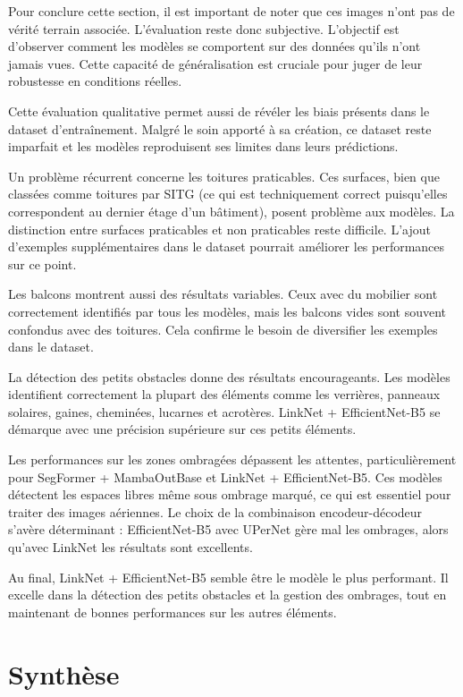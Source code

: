 Pour conclure cette section, il est important de noter que ces images n'ont pas de vérité terrain associée. L'évaluation reste donc subjective. L'objectif est d'observer comment les modèles se comportent sur des données qu'ils n'ont jamais vues. Cette capacité de généralisation est cruciale pour juger de leur robustesse en conditions réelles.

Cette évaluation qualitative permet aussi de révéler les biais présents dans le dataset d'entraînement. Malgré le soin apporté à sa création, ce dataset reste imparfait et les modèles reproduisent ses limites dans leurs prédictions.

Un problème récurrent concerne les toitures praticables. Ces surfaces, bien que classées comme toitures par SITG (ce qui est techniquement correct puisqu'elles correspondent au dernier étage d'un bâtiment), posent problème aux modèles. La distinction entre surfaces praticables et non praticables reste difficile. L'ajout d'exemples supplémentaires dans le dataset pourrait améliorer les performances sur ce point.

Les balcons montrent aussi des résultats variables. Ceux avec du mobilier sont correctement identifiés par tous les modèles, mais les balcons vides sont souvent confondus avec des toitures. Cela confirme le besoin de diversifier les exemples dans le dataset.

La détection des petits obstacles donne des résultats encourageants. Les modèles identifient correctement la plupart des éléments comme les verrières, panneaux solaires, gaines, cheminées, lucarnes et acrotères. LinkNet + EfficientNet-B5 se démarque avec une précision supérieure sur ces petits éléments.

Les performances sur les zones ombragées dépassent les attentes, particulièrement pour SegFormer + MambaOutBase et LinkNet + EfficientNet-B5. Ces modèles détectent les espaces libres même sous ombrage marqué, ce qui est essentiel pour traiter des images aériennes. Le choix de la combinaison encodeur-décodeur s'avère déterminant : EfficientNet-B5 avec UPerNet gère mal les ombrages, alors qu'avec LinkNet les résultats sont excellents.

Au final, LinkNet + EfficientNet-B5 semble être le modèle le plus performant. Il excelle dans la détection des petits obstacles et la gestion des ombrages, tout en maintenant de bonnes performances sur les autres éléments.


\section{Synthèse}

